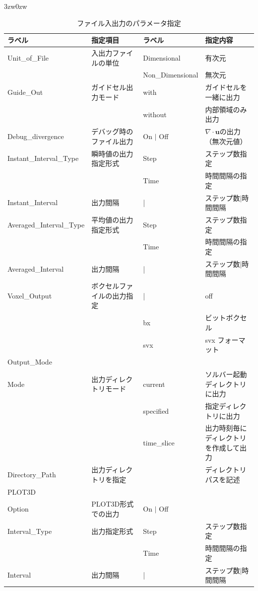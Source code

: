 \begin{indentation}{3zw}{0zw}
\begin{table}[htdp]
\caption{ファイル入出力のパラメータ指定}
\begin{center}
\small
\begin{tabular}{llll} \toprule
ラベル & 指定項目 & ラベル & 指定内容 \\ \midrule
Unit\_of\_File & 入出力ファイルの単位 & Dimensional & 有次元\\
& & Non\_Dimensional & 無次元\\ \hline
Guide\_Out & ガイドセル出力モード & with & ガイドセルを一緒に出力\\
& & without & 内部領域のみ出力\\ \hline
Debug\_divergence & デバッグ時のファイル出力 & On $|$ Off & $\nabla \cdot \bm{u}$の出力（無次元値）\\ \hline
Instant\_Interval\_Type & 瞬時値の出力指定形式 & Step & ステップ数指定\\
& & Time & 時間間隔の指定\\
Instant\_Interval & 出力間隔 & | & ステップ数$|$時間間隔\\ \hline
Averaged\_Interval\_Type & 平均値の出力指定形式 & Step & ステップ数指定\\
& & Time & 時間間隔の指定\\
Averaged\_Interval & 出力間隔 & | & ステップ数$|$時間間隔\\ \hline
Voxel\_Output & ボクセルファイルの出力指定 & | & off\\
 & & bx & ビットボクセル\\
 & & svx & svx フォーマット\\ \hline
Output\_Mode & & & \\
Mode & 出力ディレクトリモード & current & ソルバー起動ディレクトリに出力\\
 & & specified & 指定ディレクトリに出力\\
 & & time\_slice & 出力時刻毎にディレクトリを作成して出力\\
Directory\_Path & 出力ディレクトリを指定 & & ディレクトリパスを記述\\ \hline
PLOT3D & & & \\
Option & PLOT3D形式での出力 & On $|$ Off & \\
Interval\_Type & 出力指定形式 & Step & ステップ数指定\\
 & & Time & 時間間隔の指定\\
Interval & 出力間隔 & | & ステップ数$|$時間間隔\\
\bottomrule
\end{tabular}
\end{center}
\label{tbl:file_IO_parameter}
\end{table}



\end{indentation}
